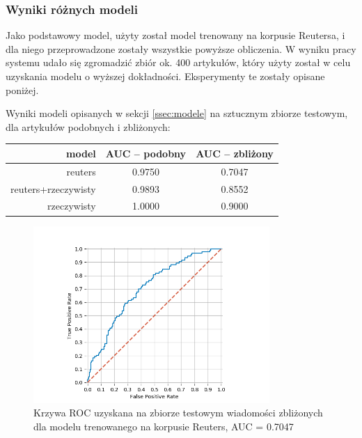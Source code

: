 \subsubsection*{Wyniki różnych modeli}
\label{sec:wyniki}

Jako podstawowy model, użyty został model trenowany na korpusie
Reutersa, i dla niego przeprowadzone zostały wszystkie powyższe
obliczenia. W wyniku pracy systemu udało się zgromadzić zbiór ok. 400
artykułów, który użyty został w celu uzyskania modelu o wyższej
dokładności. Eksperymenty te zostały opisane poniżej.


Wyniki modeli opisanych w sekcji \ref{ssec:modele} na sztucznym zbiorze
testowym, dla artykułów podobnych i zbliżonych:

\begin{center}
\begin{tabular}{r|c|c}
model & AUC -- podobny & AUC -- zbliżony\\
\hline
reuters & 0.9750 & 0.7047\\
reuters+rzeczywisty & 0.9893 & 0.8552\\
rzeczywisty & 1.0000 & 0.9000\\
\end{tabular}
\end{center}


\begin{figure}[p]
\centering
\includegraphics[width=0.8\textwidth]{./pict/reuters_z.png}
\caption{Krzywa ROC uzyskana na zbiorze testowym wiadomości zbliżonych  dla modelu trenowanego na korpusie Reuters, AUC = 0.7047}
\label{fig:rocidentical}
\end{figure}


